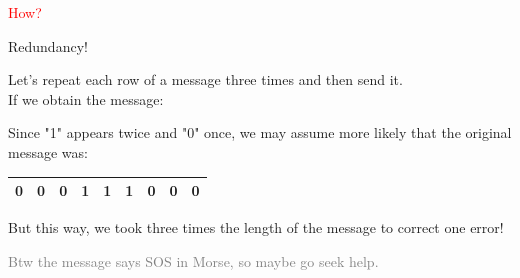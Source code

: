 \begin{frame}

    \vspace{-2cm} %
    \hspace{2.3cm}\textcolor{red}{How?} \pause 
    \begin{center}
        \alert<1>{\Huge Redundancy!} \\ \pause
    \end{center}
    \pause
    Let's repeat each row of a message three times and then send it.\\ \pause
    If we obtain the message:
    \pause
    
    \pause
    \bigskip
    
    Since "1" appears twice and "0" once, we may assume more likely that the original message was:
    \pause
    \bigskip
    
    \begin{center}
    \begin{tabular}{|c|c|c|c|c|c|c|c|c|}
        \hline
        0 & 0 & 0 & 1 & \cellcolor{green!20} 1 & 1 & 0 & 0 & 0 \\
        \hline
    \end{tabular}
    \end{center}
    \pause
    \bigskip
    
    But this way, we took three times the length of the message to correct one error!
    
    \bigskip
    \pause
    \textcolor{gray}{Btw the message says SOS in Morse, so maybe go seek help.}
    \end{frame}
    
